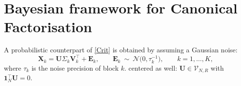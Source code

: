 \documentclass[11pt]{article}
\newtheorem{remark}{Remark}
\newcommand{\X}{\mathbf{X}}
\newcommand{\U}{\mathbf{U}}
\newcommand{\V}{\mathbf{V}}
\newcommand{\EE}{\mathbf{E}}
\newcommand{\one}{\mathbf{1}}
\newcommand{\Stiefel}[2]{\mathcal V_{#1,#2}}
\begin{document}




\section{Bayesian framework for Canonical Factorisation}

A probabilistic counterpart of \eqref{Crit} is obtained by assuming a Gaussian noise:
\begin{equation}
  \X_k=\U\Sigma_k\V_k^\intercal+\EE_k,\qquad
  \EE_k\ \sim \ \mathcal N\bigl(0,\tau_k^{-1}\bigr),\qquad k=1,\ldots,K,
  \label{eq:model}
\end{equation}
where $\tau_k$ is the noise precision of block $k$. %
centered as well: $\U\in\Stiefel{N}{R}$ with $\one_N^\intercal\U=0$.
\end{document}
